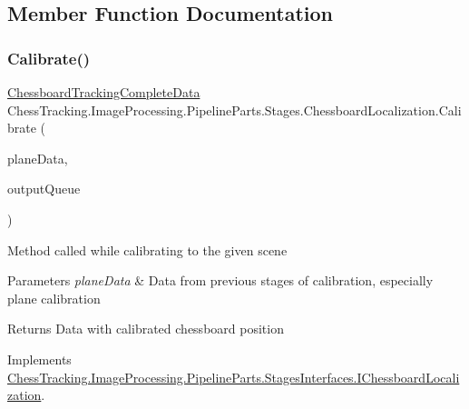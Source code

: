 \subsection{Member Function Documentation}
\mbox{\label{class_chess_tracking_1_1_image_processing_1_1_pipeline_parts_1_1_stages_1_1_chessboard_localization_a488e6669ff26af88dc52e14f7a661e13}} 
\subsubsection{\texorpdfstring{Calibrate()}{Calibrate()}}
{\footnotesize\ttfamily \mbox{\hyperlink{class_chess_tracking_1_1_image_processing_1_1_pipeline_data_1_1_chessboard_tracking_complete_data}{Chessboard\+Tracking\+Complete\+Data}} Chess\+Tracking.\+Image\+Processing.\+Pipeline\+Parts.\+Stages.\+Chessboard\+Localization.\+Calibrate (\begin{DoxyParamCaption}\item[{\mbox{\hyperlink{class_chess_tracking_1_1_image_processing_1_1_pipeline_data_1_1_plane_tracking_complete_data}{Plane\+Tracking\+Complete\+Data}}}]{plane\+Data,  }\item[{Blocking\+Collection$<$ \mbox{\hyperlink{class_chess_tracking_1_1_multithreading_messages_1_1_message}{Message}} $>$}]{output\+Queue }\end{DoxyParamCaption})}



Method called while calibrating to the given scene 


\begin{DoxyParams}{Parameters}
{\em plane\+Data} & Data from previous stages of calibration, especially plane calibration\\
\hline
\end{DoxyParams}
\begin{DoxyReturn}{Returns}
Data with calibrated chessboard position
\end{DoxyReturn}


Implements \mbox{\hyperlink{interface_chess_tracking_1_1_image_processing_1_1_pipeline_parts_1_1_stages_interfaces_1_1_i_chessboard_localization_a123320210fd4312b27bea5f39a7c57f0}{Chess\+Tracking.\+Image\+Processing.\+Pipeline\+Parts.\+Stages\+Interfaces.\+I\+Chessboard\+Localization}}.

